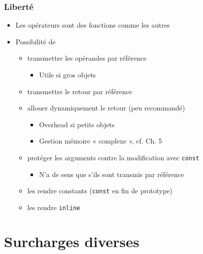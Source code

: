 \begin{frame}
\frametitle{Liberté}
\begin{itemize}[<+->]
\item Les opérateurs sont des fonctions comme les autres	
\item Possibilité de 
	\begin{itemize}
	\item transmettre les opérandes par référence
		\begin{itemize}
		\item Utile si gros objets
		\end{itemize}
	\item transmettre le retour par référence
	\item allouer dynamiquement le retour (peu recommandé)
		\begin{itemize}
		\item Overhead si petits objets
		\item Gestion mémoire « complexe », cf. Ch. 5
		\end{itemize}
	\item protéger les arguments contre la modification avec \lstinline|const|
		\begin{itemize}
		\item N'a de sens que s'ils sont transmis par référence
		\end{itemize}
	\item les rendre constants (\lstinline|const| en fin de prototype)
	\item les rendre \lstinline|inline|
	\end{itemize}
\end{itemize}
\end{frame}

\section[Surch. div.]{Surcharges diverses}

